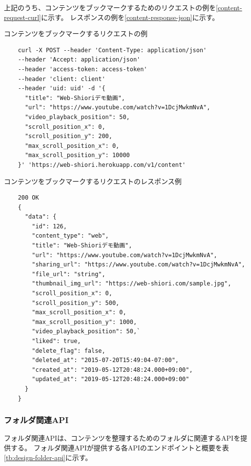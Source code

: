 上記のうち、コンテンツをブックマークするためのリクエストの例を\ref{content-request-curl}に示す。
レスポンスの例を\ref{content-response-json}に示す。

\begin{itembox}[l]{コンテンツをブックマークするリクエストの例}
  \label{content-request-curl}
  \begin{verbatim}
    curl -X POST --header 'Content-Type: application/json' 
    --header 'Accept: application/json' 
    --header 'access-token: access-token' 
    --header 'client: client' 
    --header 'uid: uid' -d '{
      "title": "Web-Shioriデモ動画",
      "url": "https://www.youtube.com/watch?v=1DcjMwkmNvA",
      "video_playback_position": 50,
      "scroll_position_x": 0,
      "scroll_position_y": 200,
      "max_scroll_position_x": 0,
      "max_scroll_position_y": 10000
    }' 'https://web-shiori.herokuapp.com/v1/content'
  \end{verbatim}
\end{itembox}

\begin{itembox}[l]{コンテンツをブックマークするリクエストのレスポンス例}
  \label{content-response-json}
  \begin{verbatim}
    200 OK
    {
      "data": {
        "id": 126,
        "content_type": "web",
        "title": "Web-Shioriデモ動画",
        "url": "https://www.youtube.com/watch?v=1DcjMwkmNvA",
        "sharing_url": "https://www.youtube.com/watch?v=1DcjMwkmNvA",
        "file_url": "string",
        "thumbnail_img_url": "https://web-shiori.com/sample.jpg",
        "scroll_position_x": 0,
        "scroll_position_y": 500,
        "max_scroll_position_x": 0,
        "max_scroll_position_y": 1000,
        "video_playback_position": 50,`
        "liked": true,
        "delete_flag": false,
        "deleted_at": "2015-07-20T15:49:04-07:00",
        "created_at": "2019-05-12T20:48:24.000+09:00",
        "updated_at": "2019-05-12T20:48:24.000+09:00"
      }
    }
  \end{verbatim}
\end{itembox}

\subsubsection{フォルダ関連API}
フォルダ関連APIは、コンテンツを整理するためのフォルダに関連するAPIを提供する。
フォルダ関連APIが提供する各APIのエンドポイントと概要を表\ref{tb:design-folder-api}に示す。

